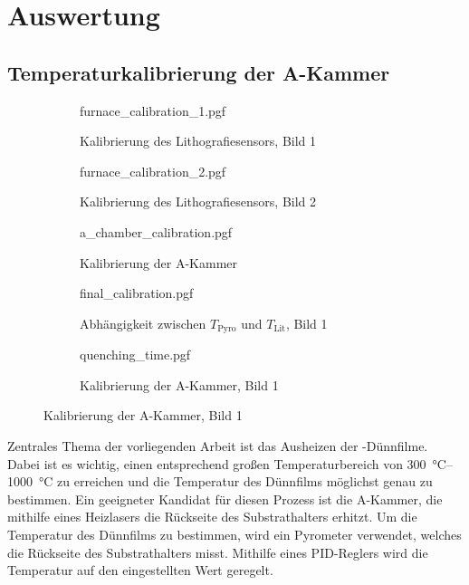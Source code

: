 \section{Auswertung}\label{sec:auswertung}

\subsection{Temperaturkalibrierung der A-Kammer}\label{subsec:temperaturkalibrierung}
\begin{figure}
    \centering
    \begin{subfigure}[b]{0.49\textwidth}
        {furnace_calibration_1.pgf}
        \caption{Kalibrierung des Lithografiesensors, Bild 1}
        \label{fig:furnace_calibration_1}
    \end{subfigure}
    \begin{subfigure}[b]{0.49\textwidth}
        {furnace_calibration_2.pgf}
        \caption{Kalibrierung des Lithografiesensors, Bild 2}
        \label{fig:furnace_calibration_2}
    \end{subfigure}
    \begin{subfigure}[b]{0.49\textwidth}
        {a_chamber_calibration.pgf}
        \caption{Kalibrierung der A-Kammer}
        \label{fig:a_chamber_calibration}
    \end{subfigure}
    \begin{subfigure}[b]{0.49\textwidth}
        {final_calibration.pgf}
        \caption{Abhängigkeit zwischen $T_{\mathrm{Pyro}}$ und $T_{\mathrm{Lit}}$, Bild 1}
        \label{fig:final_calibration}
    \end{subfigure}
    \begin{subfigure}[b]{0.49\textwidth}
        {quenching_time.pgf}
        \caption{Kalibrierung der A-Kammer, Bild 1}
        \label{fig:quenching_time}
    \end{subfigure}
    \label{fig:temperature_calibration_1}
\end{figure}
Zentrales Thema der vorliegenden Arbeit ist das Ausheizen der \heo-Dünnfilme.
Dabei ist es wichtig, einen entsprechend großen Temperaturbereich von \qtyrange{300}{1000}{\degreeCelsius} zu erreichen
und die Temperatur des Dünnfilms möglichst genau zu bestimmen.
Ein geeigneter Kandidat für diesen Prozess ist die A-Kammer, die mithilfe eines Heizlasers die Rückseite des
Substrathalters erhitzt.
Um die Temperatur des Dünnfilms zu bestimmen, wird ein Pyrometer verwendet, welches die Rückseite des Substrathalters
misst.
Mithilfe eines PID-Reglers wird die Temperatur auf den eingestellten Wert geregelt.

